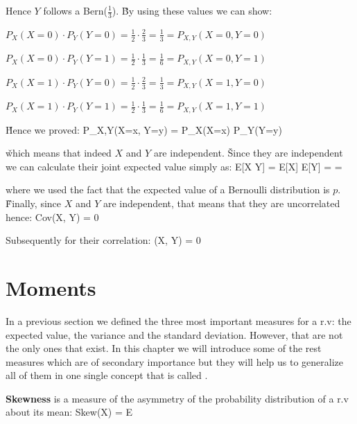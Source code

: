 Hence $Y$ follows a Bern\Big($\frac{1}{3}$\Big). \v

By using these values we can show:
\bit
\item $P_{X}(X=0) \cdot P_{Y}(Y=0) = \frac{1}{2} \cdot \frac{2}{3} = \frac{1}{3} = P_{X,Y}(X=0, Y=0)$
\item $P_{X}(X=0) \cdot P_{Y}(Y=1) = \frac{1}{2} \cdot \frac{1}{3} = \frac{1}{6} = P_{X,Y}(X=0, Y=1)$
\item $P_{X}(X=1) \cdot P_{Y}(Y=0) = \frac{1}{2} \cdot \frac{2}{3} = \frac{1}{3} = P_{X,Y}(X=1, Y=0)$
\item $P_{X}(X=1) \cdot P_{Y}(Y=1) = \frac{1}{2} \cdot \frac{1}{3} = \frac{1}{6} = P_{X,Y}(X=1, Y=1)$
\eit

\v

Hence we proved:
\bse
P_{X,Y}(X=x, Y=y) = P_{X}(X=x) \cdot P_{Y}(Y=y)
\ese

\v

which means that indeed $X$ and $Y$ are independent. \v

Since they are independent we can calculate their joint expected value simply as:
\bse
E[X \cdot Y] = E[X] \cdot E[Y] =  \cdot {} = 
\ese

where we used the fact that the expected value of a Bernoulli distribution is $p$. \v

Finally, since $X$ and $Y$ are independent, that means that they are uncorrelated hence:
\bse
Cov(X, Y) = 0
\ese

Subsequently for their correlation:
\bse
\rho(X, Y) = 0
\ese

\section{Moments}

In a previous section we defined the three most important measures for a r.v: the expected value, the variance and
the standard deviation. However, that are not the only ones that exist. In this chapter we will introduce some of the
rest measures which are of secondary importance but they will help us to generalize all of them in one single concept
that is called .

\bd[Skewness]
\textbf{Skewness} is a measure of the asymmetry of the probability distribution of a r.v about its mean:
\bse
Skew(X) = E 
\ese
\ed

\vspace{10pt}


